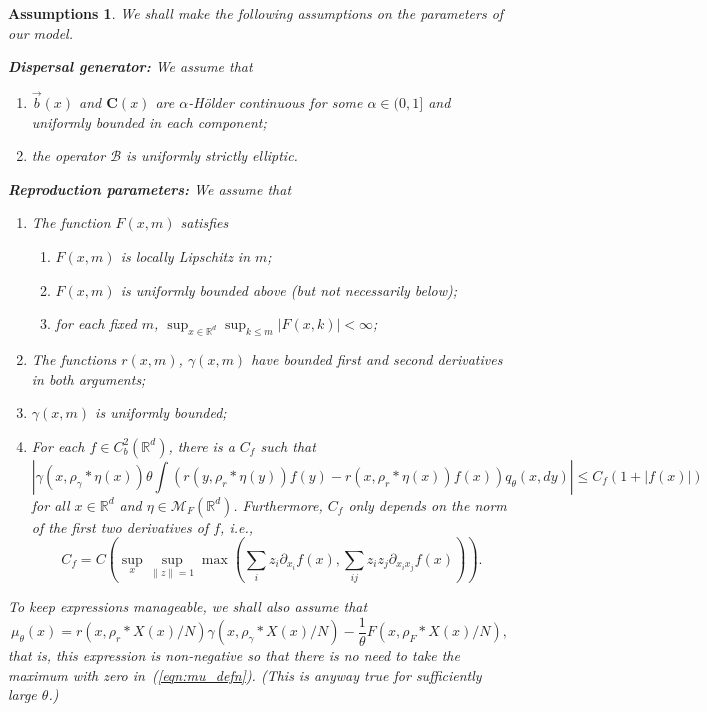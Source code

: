 \documentclass[12pt]{article}
\newtheorem{assumptions}[theorem]{Assumptions}
\newcommand{\IR}{\mathbb R}
\newcommand{\DG}{\mathcal{B}}  %
\newcommand{\meanq}{\vec b}    %
\newcommand{\covq}{\mathbf{C}}     %
\newcommand{\kernel}{\rho}  %
\newcommand{\smooth}[1]{\kernel_{#1} \! * \!}  %
\newcommand{\measures}{\mathcal{M}_F(\IR^d)} %
\numberwithin{equation}{section}
\begin{document}
\begin{assumptions}%
\label{def:model_setup}
We shall make the following assumptions on the parameters of our model.

{\bf Dispersal generator:}
We assume that
\begin{enumerate}
    \item $\meanq(x)$ and $\covq(x)$ are
        $\alpha$-H\"older continuous for some $\alpha \in (0, 1]$
        and uniformly bounded
        in each component;
    \item the operator $\DG$ is uniformly strictly elliptic.
\end{enumerate}

{\bf Reproduction parameters:}
We assume that 
\begin{enumerate}
            \addtocounter{enumi}{2}
\item The function $F(x,m)$ satisfies 
    \begin{enumerate}
    \item $F(x,m)$ is locally Lipschitz in $m$;
    \item $F(x,m)$ is uniformly bounded above (but not necessarily below);
    \item for each fixed $m$, $\sup_{x\in\IR^d}\sup_{k\leq m}|F(x,k)|<\infty$;
    \end{enumerate}
\item The functions $r(x,m)$, $\gamma(x,m)$ have bounded first and second 
    derivatives in both arguments;
    \label{r_gamma_derivs_condition}
\item $\gamma(x,m)$ is uniformly bounded;
    \label{gamma_bounded_condition}
\item For each $f \in C_b^2(\IR^d)$,
    there is a $C_f$ such that
    $$
        |\gamma(x, \smooth{\gamma} \eta(x)) \theta \int 
        (r(y, \smooth{r} \eta(y)) f(y) - r(x, \smooth{r} \eta(x)) f(x))
        q_\theta(x, dy)| \le C_f (1 + |f(x)|)
    $$
    for all $x \in \IR^d$ and $\eta \in \measures$.
    Furthermore, $C_f$ only depends on the norm of the first two derivatives of $f$,
    i.e., 
    \[
        C_f = C(\sup_x \sup_{\|z\|=1} \max( \sum_i z_i \partial_{x_i} f(x), \sum_{ij} z_i z_j \partial_{x_i x_j} f(x))) .
    \] \label{gamma_B_condition}
\end{enumerate}
To keep expressions manageable, we shall also assume that 
\[
\mu_\theta(x) = r(x, \smooth{r} X(x) / N) \gamma(x, \smooth{\gamma} X(x) / N)
        - \frac{1}{\theta} F(x, \smooth{F} X(x) / N),
\]
that is, this expression is non-negative so that there is no need to take the maximum
	with zero in~(\ref{eqn:mu_defn}). (This is anyway true for 
	sufficiently large $\theta$.)
\end{assumptions}
\end{document}
